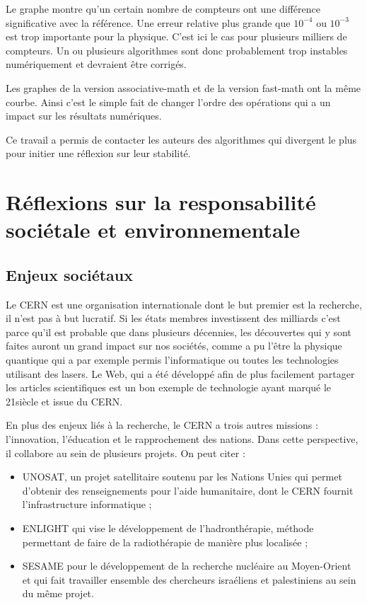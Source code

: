 \documentclass[a4paper,11pt]{report}
\begin{document}
Le graphe montre qu'un certain nombre de compteurs ont une différence significative avec la référence.
Une erreur relative plus grande que $10^{-4}$ ou $10^{-3}$ est trop importante pour la physique.
C'est ici le cas pour plusieurs milliers de compteurs.
Un ou plusieurs algorithmes sont donc probablement trop instables numériquement et devraient être corrigés.

Les graphes de la version associative-math et de la version fast-math ont la même courbe.
Ainsi c'est le simple fait de changer l'ordre des opérations qui a un impact sur les résultats numériques.

Ce travail a permis de contacter les auteurs des algorithmes qui divergent le plus pour initier une réflexion sur leur stabilité.

\chapter*{Réflexions sur la responsabilité sociétale et environnementale}
\section*{Enjeux sociétaux}
Le CERN est une organisation internationale dont le but premier est la recherche, il n'est pas à but lucratif.
Si les états membres investissent des milliards c'est parce qu'il est probable que dans plusieurs décennies, les découvertes qui y sont faites auront un grand impact sur nos sociétés,
comme a pu l'être la physique quantique qui a par exemple permis l'informatique ou toutes les technologies utilisant des lasers.
Le Web, qui a été développé afin de plus facilement partager les articles scientifiques est un bon exemple de technologie ayant marqué le 21\ieme siècle et issue du CERN.

En plus des enjeux liés à la recherche, le CERN a trois autres missions : l'innovation, l'éducation et le rapprochement des nations.
Dans cette perspective, il collabore au sein de plusieurs projets. On peut citer :
\begin{itemize}
    \item UNOSAT, un projet satellitaire soutenu par les Nations Unies qui permet d'obtenir des renseignements pour l'aide humanitaire, dont le CERN fournit l'infrastructure informatique ;
    \item ENLIGHT qui vise le développement de l'hadronthérapie, méthode permettant de faire de la radiothérapie de manière plus localisée ;
    \item SESAME pour le développement de la recherche nucléaire au Moyen-Orient et qui fait travailler ensemble des chercheurs israéliens et palestiniens au sein du même projet.
\end{itemize}
\end{document}
